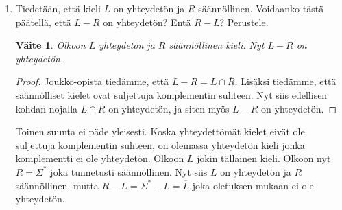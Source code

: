 \documentclass[a4paper,11pt, draft]{article}
\newtheorem*{claim}{Väite}
\begin{document}
\begin{enumerate}
\begin{enumerate}
    \item
      Tiedetään, että kieli $L$ on yhteydetön ja $R$ säännöllinen. Voidaanko
      tästä päätellä, että $L-R$ on yhteydetön? Entä $R-L$? Perustele.

      \begin{claim}
        Olkoon $L$ yhteydetön ja $R$ säännöllinen kieli. Nyt $L - R$ on
        yhteydetön.
      \end{claim}
      \begin{proof}
        Joukko-opista tiedämme, että $L - R = L \cap \overline{R}$. Lisäksi
        tiedämme, että säännölliset kielet ovat suljettuja komplementin
        suhteen. Nyt siis edellisen kohdan nojalla $L \cap \overline{R}$ on
        yhteydetön, ja siten myös $L - R$ on yhteydetön.
      \end{proof}

      Toinen suunta ei päde yleisesti. Koska yhteydettömät kielet eivät ole
      suljettuja komplementin suhteen, on olemassa yhteydetön kieli jonka
      komplementti ei ole yhteydetön. Olkoon $L$ jokin tällainen kieli. Olkoon
      nyt $R = \Sigma^*$ joka tunnetusti säännöllinen. Nyt siis $L$ on
      yhteydetön ja $R$ säännöllinen, mutta $R - L = \Sigma^* - L =
      \overline{L}$ joka oletuksen mukaan ei ole yhteydetön.
    \end{enumerate}
\end{enumerate}
\end{document}
